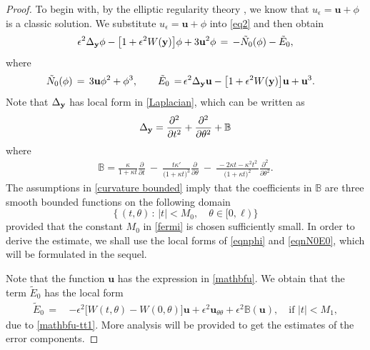 \documentclass[10pt, reqno]{amsart}
\numberwithin{equation}{section}
\theoremstyle{definition}
\begin{document}
{{\begin{proof}
To begin with, by the elliptic regularity theory \cite{Gilbarg}, we know that $u_\epsilon={\mathbf u}+\phi$ is a classic solution.
We substitute $u_\epsilon={\mathbf u}+\phi$ into \eqref{eq2} and then obtain
\begin{align}
\epsilon^2\Delta_{\bf y}\phi - \big[1+ \epsilon^2 W ({\bf y}) \big] \phi + 3 {\mathbf u}^2 \phi \,=\, - \tilde N_0 (\phi ) - \tilde E_0,
 \label{eqnphi}
\end{align}
 where
\begin{align}
 \label{eqnN0E0}
 \tilde N_0(\phi) \,=\, 3 {\mathbf u} \phi^2 + \phi^3,
 \qquad
 \tilde E_0\,=\, &\epsilon^2\Delta_{\bf y} {\mathbf u} - \big[1+ \epsilon^2 W ({\bf y}) \big] {\mathbf u} + {\mathbf u}^3.
\end{align}
Note that $\Delta_{\bf y}$ has local form in \eqref{Laplacian}, which can be written as
\begin{align}
\Delta_{\bf y}=\frac{\partial^2}{\partial t^2}+\frac{\partial^2}{\partial \theta^2}+{\mathbb B}
\label{laplacian1}
\end{align}
where
\begin{align}
{\mathbb B}=
 \frac{\kappa}{1+\kappa t} \frac{\partial }{\partial t}
\ -\
\frac{ t \kappa'}{\big(1+ \kappa t\big)^3 }\frac{\partial}{\partial \theta}
\ -\
\frac{\,-2\kappa t-\kappa^2t^2\,}{\big(1+\kappa t\big)^2 }\frac{\partial^2}{\partial \theta^2}.
\end{align}
The assumptions in \eqref{curvature bounded} imply that the coefficients in ${\mathbb B}$ are three smooth bounded functions on the following domain
$$
\Big\{\, (t, \theta)\, :\, |t|<M_0, \quad \theta\in [0, \ell)\, \Big\}
$$
provided that the constant $M_0$ in \eqref{fermi} is chosen sufficiently small.
In order to derive the estimate,
we shall use the local forms of \eqref{eqnphi} and \eqref{eqnN0E0},
 which will be formulated in the sequel.


Note that the function $\mathbf u$ has the expression in \eqref{mathbfu}.
We obtain that the term $\tilde E_0$ has the local form
\begin{align*}
 \tilde E_0
 \,=\, &- \epsilon^2\big[W (t, \theta) - W(0, \theta) \big] {\mathbf u}
 + \epsilon^2{\mathbf u}_{\theta\theta}
 + \epsilon^2{\mathbb B} ({\mathbf u}),
\quad\mbox{if } |t|<M_1,
\end{align*}
due to \eqref{mathbfu-tt1}.
More analysis will be provided to get the estimates of the error components.


\end{proof}}}
\end{document}
